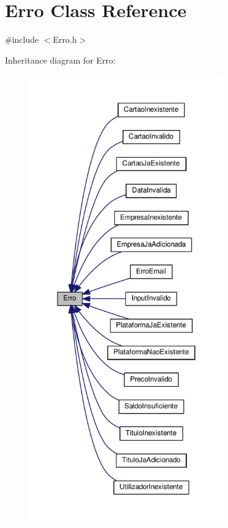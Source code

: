 \hypertarget{classErro}{}\section{Erro Class Reference}
\label{classErro}


{\ttfamily \#include $<$Erro.\+h$>$}



Inheritance diagram for Erro\+:
\nopagebreak
\begin{figure}[H]
\begin{center}
\leavevmode
\includegraphics[height=550pt]{classErro__inherit__graph}
\end{center}
\end{figure}
